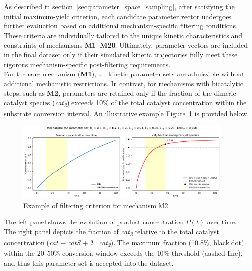 \documentclass{dissertation}
\begin{document}
As described in section~\ref{sec:parameter_space_sampling}, after satisfying the initial maximum-yield criterion, each candidate parameter vector undergoes further evaluation based on additional mechanism-specific filtering conditions. These criteria are individually tailored to the unique kinetic characteristics and constraints of mechanisms \textbf{M1–M20}. Ultimately, parameter vectors are included in the final dataset only if their simulated kinetic trajectories fully meet these rigorous mechanism-specific post-filtering requirements.\\

For the core mechanism (\textbf{M1}), all kinetic parameter sets are admissible without additional mechanistic restrictions. In contrast, for mechanisms with bicatalytic steps, such as \textbf{M2}, parameters are retained only if the fraction of the dimeric catalyst species (\emph{cat\textsubscript{2}}) exceeds 10\% of the total catalyst concentration within the substrate conversion interval. An illustrative example Figure~\ref{fig:M2_criterion} is provided below.

\begin{figure}[H]
    \hspace*{-5pt}
    \includegraphics[width=0.95\textwidth]{data_generation/M2.pdf}
    \caption{Example of filtering criterion for mechanism M2}
    \label{fig:M2_criterion}
\end{figure}

The left panel shows the evolution of product concentration $P(t)$ over time. The right panel depicts the fraction of \emph{cat\textsubscript{2}} relative to the total catalyst concentration (\emph{cat} + \emph{catS} + 2·\emph{cat\textsubscript{2}}). The maximum fraction (10.8\%, black dot) within the 20–50\% conversion window exceeds the 10\% threshold (dashed line), and thus this parameter set is accepted into the dataset.\\
\end{document}
